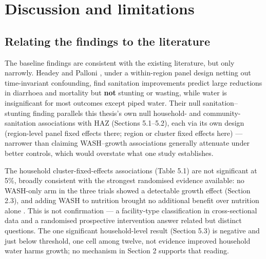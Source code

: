 
\section{Discussion and limitations}\label{sec:6}

\subsection{Relating the findings to the literature}\label{sec:6.1}

The baseline findings are consistent with the existing literature, but only narrowly. Headey and Palloni \autocite*{HeadeyPalloni2019}, under a within-region panel design netting out time-invariant confounding, find sanitation improvements predict large reductions in diarrhoea and mortality but \textbf{not} stunting or wasting, while water is insignificant for most outcomes except piped water. Their null sanitation--stunting finding parallels this thesis's own null household- and community-sanitation associations with HAZ (Sections 5.1--5.2), each via its own design (region-level panel fixed effects there; region or cluster fixed effects here) --- narrower than claiming WASH--growth associations generally attenuate under better controls, which would overstate what one study establishes.

The household cluster-fixed-effects associations (Table 5.1) are not significant at 5\%, broadly consistent with the strongest randomised evidence available: no WASH-only arm in the three trials showed a detectable growth effect (Section 2.3), and adding WASH to nutrition brought no additional benefit over nutrition alone \autocite{Cumming2019}. This is not confirmation --- a facility-type classification in cross-sectional data and a randomised prospective intervention answer related but distinct questions. The one significant household-level result (Section 5.3) is negative and just below threshold, one cell among twelve, not evidence improved household water harms growth; no mechanism in Section 2 supports that reading.

